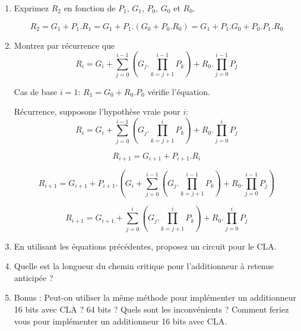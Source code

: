 \documentclass[a4paper,10pt]{exam}
\begin{document}
\begin{enumerate}
\item Exprimez $R_2$ en fonction de $P_1$, $G_1$, $P_0$, $G_0$ et $R_0$.
\begin{solution}
  $$ R_2 = G_1 + P_1.R_1 = G_1 + P_1.(G_0 + P_0.R_0) = G_1 + P_1.G_0 + P_0.P_1.R_0$$
\end{solution}

\item Montrez par récurrence que
  $$R_i = G_i + \sum^{i-1}_{j=0}{(G_j.\prod^{i-1}_{k=j+1}{P_k})} + R_0.\prod^{i-1}_{j=0}{P_j}$$

\begin{solution}
  Cas de base $i=1$: $R_1 = G_0 + R_0.P_0$ vérifie l'équation.

  Récurrence, supposons l'hypothèse vraie pour $i$:
  $$R_i = G_i + \sum^{i-1}_{j=0}{(G_j.\prod^i_{k=j+1}{P_k})} +
  R_0.\prod^i_{j=0}{P_j}$$

  $$R_{i+1} = G_{i+1} + P_{i+1}.R_{i}$$

  $$R_{i+1} = G_{i+1} + P_{i+1}.(G_i + \sum^{i-1}_{j=0}{(G_j.\prod^{i-1}_{k=j+1}{P_k})} +
  R_0.\prod^{i-1}_{j=0}{P_j})$$

  $$ R_{i+1} = G_{i+1} + \sum^{i}_{j=0}{(G_j.\prod^{i}_{k=j+1}{P_k})} +
  R_0.\prod^{i}_{j=0}{P_j}$$
\end{solution}

\item En utilisant les équations précédentes, proposez un circuit pour le CLA.
\item Quelle est la longueur du chemin critique pour l'additionneur à retenue
  anticipée ?
\begin{solution}

\end{solution}

\item Bonus : Peut-on utiliser la même méthode pour implémenter un additionneur
  16 bits avec CLA ? 64 bits ? Quels sont les inconvénients ? Comment feriez
  vous pour implémenter un additionneur 16 bits avec CLA.
\end{enumerate}
\end{document}
